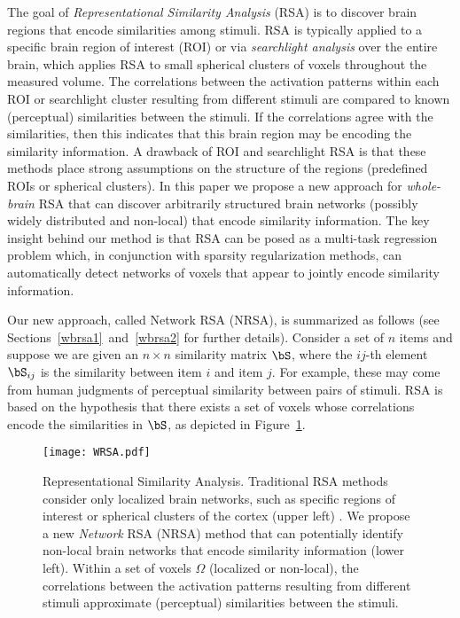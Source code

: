 The goal of \emph{Representational Similarity Analysis} (RSA) \cite{RSA} is to discover brain regions that encode similarities among stimuli. RSA is typically applied to a specific brain region of interest (ROI) or via {\em searchlight analysis} \cite{searchlight}  over the entire brain, which applies RSA to small spherical clusters of voxels throughout the measured volume.  The correlations between the activation patterns within each ROI or searchlight cluster resulting from different stimuli are compared to known (perceptual) similarities between the stimuli.  If the correlations agree with the similarities, then this indicates that this brain region may be encoding the similarity information.  A drawback of ROI and searchlight RSA is that these methods place strong assumptions on the structure of the regions (predefined ROIs or spherical clusters).   In this paper we propose a new approach for {\em whole-brain} RSA that can discover arbitrarily structured brain networks (possibly widely
distributed and non-local) that encode similarity information. The key insight behind our method is that RSA can be posed as a multi-task regression problem which, in conjunction with sparsity regularization methods, can automatically detect networks of voxels that appear to jointly encode similarity information.

Our new approach, called Network RSA (NRSA), is summarized as follows (see Sections~\ref{wbrsa1}~and~\ref{wbrsa2} for further details).  Consider a set of $n$ items and suppose we are given an $n \times n$ similarity matrix $\bS$, where the $ij$-th element $\bS_{ij}$ is the similarity\cite{similarity} between item $i$ and item $j$. For example, these may come from human judgments of perceptual similarity between pairs of stimuli.  RSA is based on the hypothesis that there exists a set of voxels whose correlations encode the similarities in $\bS$, as depicted in Figure~\ref{fig.fitting}.


\begin{figure}[!h]
	\centering
	          \texttt{[image: WRSA.pdf]} \\
	        
	\caption{Representational Similarity Analysis.  Traditional RSA methods consider only localized brain networks, such as specific regions of interest or spherical clusters of the cortex (upper left) \cite{RSA,searchlight}.  We propose a new {\em Network} RSA (NRSA) method that can potentially identify non-local brain networks that encode similarity information (lower left).  Within a set of voxels $\Omega$ (localized or non-local), the correlations between the activation patterns resulting from different stimuli approximate (perceptual) similarities between the stimuli.  } \label{Fig:WRSA}
	\label{fig.fitting}
\end{figure}


